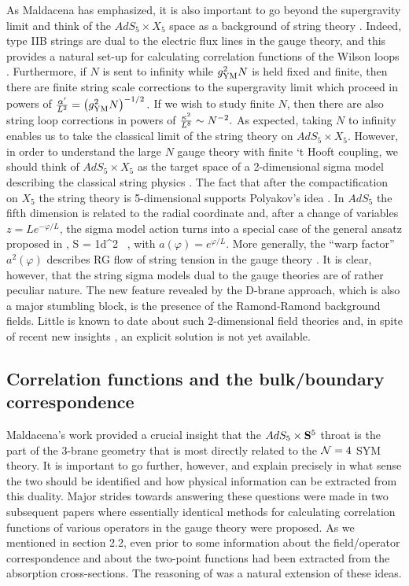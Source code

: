 As Maldacena has emphasized, it is also important to go beyond
the supergravity limit and think of the $AdS_5\times X_5$ space
as a background of string theory \cite{jthroat}. Indeed, type IIB strings
are dual to the electric flux lines in the gauge theory, and
this provides a natural set-up for calculating correlation 
functions of the Wilson loops \cite{Malda}. 
Furthermore, if $N$ is sent to infinity
while $g_{\rm YM}^2 N$ is held fixed and finite, then there are finite
string scale corrections to the supergravity limit \cite{jthroat,US,EW}
which proceed in powers of
${\alpha'\over L^2} = \left (g_{\rm YM}^2 N \right)^{-1/2}
.
$
If we wish to study finite $N$, then there are also string loop
corrections in powers of
$ {\kappa^2\over L^8} \sim N^{-2}
.
$
As expected, taking $N$ to infinity enables us to take
the classical limit of the string theory on $AdS_5\times X_5$.
However, in order to understand the large $N$
gauge theory with finite `t Hooft coupling,
we should think of $AdS_5\times X_5$ as the target space of a 
2-dimensional sigma model describing the classical string physics 
\cite{US}. The fact that after the compactification on $X_5$ 
the string theory is 5-dimensional supports Polyakov's idea \cite{Sasha}.
In $AdS_5$ the fifth dimension is related to
the radial coordinate and, after a change of variables
$z= L e^{-\varphi/L}$, the sigma model action turns into a special
case of the general ansatz proposed in \cite{Sasha},
\be
S = {1}\int d^2 
\ ,
\ee
with $a(\varphi) = e^{\varphi/L}$. More generally, the ``warp factor''
$a^2(\varphi)$ describes RG flow of string tension in the
gauge theory \cite{Sasha}.
It is clear, however, that the string sigma models dual to the gauge
theories are of rather peculiar nature. The new feature revealed
by the D-brane approach, which is also a major stumbling block,
is the presence of the Ramond-Ramond background fields. Little is known
to date about such 2-dimensional field theories and, in spite of
recent new insights \cite{MT,BVW,Berk}, 
an explicit solution is not yet available.

\subsection{Correlation functions and the bulk/boundary correspondence}

Maldacena's work provided a crucial insight that the $AdS_5\times {\bf S}^5$ 
throat is the part of the 3-brane geometry that is most directly related
to the ${\cal N}=4$ SYM theory. It is important to go further, however,
and explain precisely in 
what sense the two should be identified and how physical information
can be extracted from this duality. Major strides towards
answering these questions were made in two subsequent papers 
\cite{US,EW} where
essentially identical methods for calculating correlation functions
of various operators in the gauge theory were proposed.
As we mentioned in section 2.2, even prior to \cite{jthroat} some
information about the field/operator correspondence
and about the two-point functions had been extracted from
the absorption cross-sections. The reasoning of \cite{US}
was a natural extension of these ideas. 


